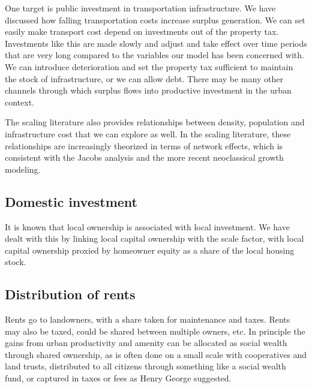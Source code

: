 One target is public investment in transportation infrastructure. We have discussed how falling transportation costs increase surplus generation.  We can set easily make transport cost depend on investments out of the property tax. Investments like this are made slowly and adjust and take effect over time periods that are very long compared to the variables our model has been concerned with. We can introduce deterioration and set the property tax sufficient to maintain the stock of infrastructure,  or we can allow debt. 
There may be many other channels through which surplus flows into productive investment in the urban context. 

The scaling literature also provides relationships between density, population and infrastructure cost that we can explore as well. In the scaling literature, these relationships are increasingly theorized in terms of network effects, which is consistent with the Jacobs analysis and the more recent neoclassical growth modeling.


\subsection{Domestic investment}
 It is known that local ownership is associated with local investment. We have dealt with this by linking local capital ownership with the scale factor, with local capital ownership proxied by homeowner equity as a share of the local housing stock.

\subsection{Distribution of rents}
Rents go to landowners, with a share taken for maintenance and taxes.
Rents may also be taxed, could be shared between multiple owners, etc.
In principle the gains from urban productivity and amenity can be allocated as social wealth through shared ownership, as is often done on a small scale with cooperatives and land trusts, distributed to all citizens through something like a social wealth fund, or captured in taxes or fees as Henry George suggested. 



